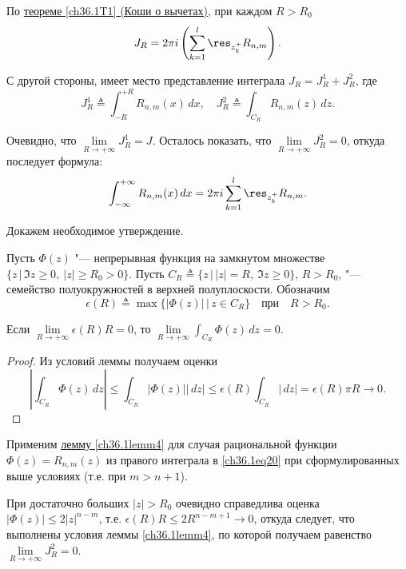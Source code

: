 По \hyperref[ch36.1T1]{теореме \ref{ch36.1T1} (Коши о вычетах)}, при каждом $R > R_0$
$$
J_R = 2\pi i\left( \sum_{k = 1}^{l} \res_{z_k^+} R_{n,m}\right).
$$

С другой стороны, имеет место представление интеграла $J_R = J_R^1 + J_R^2$, где 
\begin{equation} \label{ch36.1eq20}
J_R^1 \triangleq \int_{-R}^{+R} R_{n,m}(x)\,dx, \quad J_R^2 \triangleq \int_{C_R} R_{n,m}(z)\,dz.
\end{equation}

Очевидно, что $\lim\limits_{R \to +\infty} J_R^1 = J$. Осталось показать, что $\lim\limits_{R \to +\infty}J_R^2 = 0$, откуда последует формула:
\begin{equation} \label{ch36.1eq21}
\int_{-\infty}^{+\infty}R_{n,m}(x)\,dx = 2\pi i\sum_{k = 1}^{l} \res_{z_k^+} R_{n,m}.
\end{equation}

Докажем необходимое утверждение.

\begin{lemm} \label{ch36.1lemm4}
Пусть $\Phi(z)$ "--- непрерывная функция на замкнутом множестве $\{ z \,\big|\, \Im z \ge 0, \ |z| \ge R_0 > 0 \}$. Пусть $C_R \triangleq \{ z \,\big|\, |z| = R, \ \Im z \ge 0 \}$, $R > R_0$, "--- семейство полуокружностей в верхней полуплоскости. Обозначим
$$
\epsilon(R) \triangleq \max\{|\Phi(z)| \,\big|\, z\in C_R \} \quad \text{при} \quad R > R_0.
$$

Если $\lim\limits_{R \to +\infty} \epsilon(R)R = 0$, то $\lim\limits_{R \to +\infty} \int_{C_R} \Phi(z)\,dz = 0$.
\end{lemm}

\begin{proof}
Из условий леммы получаем оценки
\begin{equation*}
\left| \int_{C_R} \Phi(z)\,dz \right| \le \int_{C_R} |\Phi(z)||\,dz| \le \epsilon(R) \int_{C_R}|\,dz| = \epsilon(R)\pi R \to 0. \tag*{\qedhere}
\end{equation*}
\end{proof}

Применим \hyperref[ch36.1lemm4]{лемму \ref{ch36.1lemm4}} для случая рациональной функции $\Phi(z) = R_{n,m}(z)$ из правого интеграла в \eqref{ch36.1eq20} при сформулированных выше условиях (т.е. при $m > n + 1$).

При достаточно больших $|z| > R_0$ очевидно справедлива оценка $|\Phi(z)| \le 2|z|^{n - m}$, т.е.
$\epsilon(R)R \le 2R^{n - m + 1} \to 0$, откуда следует, что выполнены условия леммы \ref{ch36.1lemm4}, по которой получаем равенство $\lim\limits_{R \to +\infty} J_R^2 = 0$.

